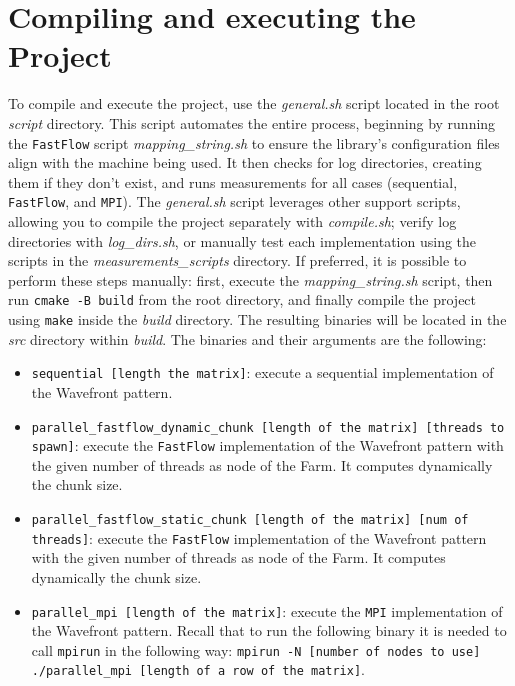 \clearpage
\section*{Compiling and executing the Project}
To compile and execute the project, use the \textit{general.sh} script located in the root \textit{script} directory. This script automates the entire process, beginning by running the \texttt{FastFlow} script \textit{mapping\_string.sh} to ensure the library's configuration files align with the machine being used. It then checks for log directories, creating them if they don't exist, and runs measurements for all cases (sequential, \texttt{FastFlow}, and \texttt{MPI}). The \textit{general.sh} script leverages other support scripts, allowing you to compile the project separately with \textit{compile.sh}; verify log directories with \textit{log\_dirs.sh}, or manually test each implementation using the scripts in the \textit{measurements\_scripts} directory. If preferred, it is possible to perform these steps manually: first, execute the \textit{mapping\_string.sh} script, then run \texttt{cmake -B build} from the root directory, and finally compile the project using \texttt{make} inside the \textit{build} directory. The resulting binaries will be located in the \textit{src} directory within \textit{build}. The binaries and their arguments are the following:

\begin{itemize}
    \item \texttt{sequential [length the matrix]}: execute a sequential implementation of the Wavefront pattern.
    \item \texttt{parallel\_fastflow\_dynamic\_chunk [length of the matrix] [threads to spawn]}: execute the \texttt{FastFlow} implementation of the Wavefront pattern with the given number of threads as node of the Farm. It computes dynamically the chunk size.
    \item \texttt{parallel\_fastflow\_static\_chunk [length of the matrix] [num of threads]}: execute the \texttt{FastFlow} implementation of the Wavefront pattern with the given number of threads as node of the Farm. It computes dynamically the chunk size.
    \item \texttt{parallel\_mpi [length of the matrix]}: execute the \texttt{MPI} implementation of the Wavefront pattern. Recall that to run the following binary it is needed to call \texttt{mpirun} in the following way: \texttt{mpirun -N [number of nodes to use] ./parallel\_mpi [length of a row of the matrix]}.
\end{itemize}

